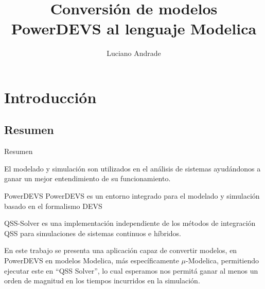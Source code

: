 \documentclass[10pt,presentation]{beamer}
\date{\displaydate{date}}
\title{Conversión de modelos PowerDEVS al lenguaje Modelica}
\author{Luciano Andrade}
\institute[UNR] 
{
Universidad Nacional de Rosario\\
\medskip
\textit{andrade.luciano@gmail.com}
}
\date{\displaydate{date}}
\newcommand{\quotes}[1]{``#1''}
\begin{document}
\begin{frame}
\titlepage %
\end{frame}

\section{Introducción}
	\subsection{Resumen}
\begin{frame}{Resumen}
\begin{block}{El modelado y simulación}
son utilizados en el análisis de sistemas  ayudándonos a ganar un mejor entendimiento de su funcionamiento. 
\end{block}

\begin{block}{PowerDEVS}
PowerDEVS es un entorno integrado para el modelado y simulación basado en el formalismo DEVS
\end{block}

\begin{block}{QSS-Solver}
es una implementación independiente de los métodos de integración QSS para simulaciones de sistemas continuos e híbridos. 
\end{block}


\begin{block}{En este trabajo}
se presenta una aplicación capaz de convertir modelos, en PowerDEVS en modelos Modelica, más específicamente $\mu$-Modelica, permitiendo ejecutar este en \quotes{QSS Solver}, lo cual esperamos nos permitá ganar al menos un orden de magnitud en los tiempos incurridos en la simulación.
\end{block}
\end{frame}
\end{document}

